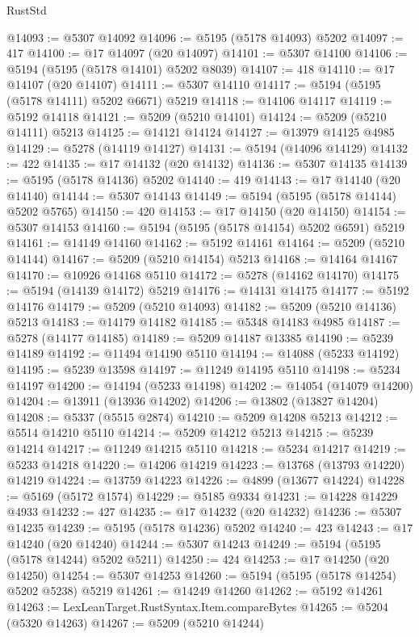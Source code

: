\begin{lexlean}{RustStd}
\begin{coremodule}
@14093 := @5307 @14092
@14096 := @5195 (@5178 @14093) @5202
@14097 := 417
@14100 := @17 @14097 (@20 @14097)
@14101 := @5307 @14100
@14106 := @5194 (@5195 (@5178 @14101) @5202 @8039)
@14107 := 418
@14110 := @17 @14107 (@20 @14107)
@14111 := @5307 @14110
@14117 := @5194 (@5195 (@5178 @14111) @5202 @6671) @5219
@14118 := @14106 @14117
@14119 := @5192 @14118
@14121 := @5209 (@5210 @14101)
@14124 := @5209 (@5210 @14111) @5213
@14125 := @14121 @14124
@14127 := @13979 @14125 @4985
@14129 := @5278 (@14119 @14127)
@14131 := @5194 (@14096 @14129)
@14132 := 422
@14135 := @17 @14132 (@20 @14132)
@14136 := @5307 @14135
@14139 := @5195 (@5178 @14136) @5202
@14140 := 419
@14143 := @17 @14140 (@20 @14140)
@14144 := @5307 @14143
@14149 := @5194 (@5195 (@5178 @14144) @5202 @5765)
@14150 := 420
@14153 := @17 @14150 (@20 @14150)
@14154 := @5307 @14153
@14160 := @5194 (@5195 (@5178 @14154) @5202 @6591) @5219
@14161 := @14149 @14160
@14162 := @5192 @14161
@14164 := @5209 (@5210 @14144)
@14167 := @5209 (@5210 @14154) @5213
@14168 := @14164 @14167
@14170 := @10926 @14168 @5110
@14172 := @5278 (@14162 @14170)
@14175 := @5194 (@14139 @14172) @5219
@14176 := @14131 @14175
@14177 := @5192 @14176
@14179 := @5209 (@5210 @14093)
@14182 := @5209 (@5210 @14136) @5213
@14183 := @14179 @14182
@14185 := @5348 @14183 @4985
@14187 := @5278 (@14177 @14185)
@14189 := @5209 @14187 @13385
@14190 := @5239 @14189
@14192 := @11494 @14190 @5110
@14194 := @14088 (@5233 @14192)
@14195 := @5239 @13598
@14197 := @11249 @14195 @5110
@14198 := @5234 @14197
@14200 := @14194 (@5233 @14198)
@14202 := @14054 (@14079 @14200)
@14204 := @13911 (@13936 @14202)
@14206 := @13802 (@13827 @14204)
@14208 := @5337 (@5515 @2874)
@14210 := @5209 @14208 @5213
@14212 := @5514 @14210 @5110
@14214 := @5209 @14212 @5213
@14215 := @5239 @14214
@14217 := @11249 @14215 @5110
@14218 := @5234 @14217
@14219 := @5233 @14218
@14220 := @14206 @14219
@14223 := @13768 (@13793 @14220) @14219
@14224 := @13759 @14223
@14226 := @4899 (@13677 @14224)
@14228 := @5169 (@5172 @1574)
@14229 := @5185 @9334
@14231 := @14228 @14229 @4933
@14232 := 427
@14235 := @17 @14232 (@20 @14232)
@14236 := @5307 @14235
@14239 := @5195 (@5178 @14236) @5202
@14240 := 423
@14243 := @17 @14240 (@20 @14240)
@14244 := @5307 @14243
@14249 := @5194 (@5195 (@5178 @14244) @5202 @5211)
@14250 := 424
@14253 := @17 @14250 (@20 @14250)
@14254 := @5307 @14253
@14260 := @5194 (@5195 (@5178 @14254) @5202 @5238) @5219
@14261 := @14249 @14260
@14262 := @5192 @14261
@14263 := LexLeanTarget.RustSyntax.Item.compareBytes
@14265 := @5204 (@5320 @14263)
@14267 := @5209 (@5210 @14244)

\end{coremodule}
\end{lexlean}
